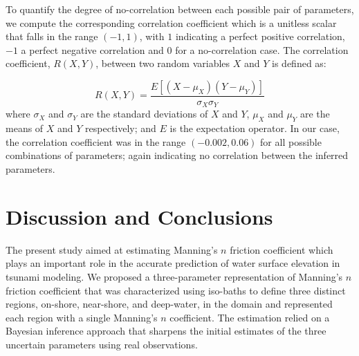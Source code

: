 \documentclass[review,12pt]{elsarticle}
\begin{document}
To quantify the degree of no-correlation between each possible pair of parameters, we compute 
the corresponding correlation coefficient which is a unitless scalar that falls in the range 
$(-1, 1)$, with $1$ indicating a perfect positive correlation, $−1$ a perfect negative correlation and $0$ for
a no-correlation case.
The correlation coefficient, $R(X, Y )$, between two random variables $X$ and $Y$ is defined as:

\begin{equation}
R(X,Y) = \frac{E[(X - \mu_X)(Y - \mu_Y )]}{\sigma_X \sigma_Y} 
\end{equation}
where $\sigma_X$ and  $\sigma_Y$ are the standard deviations of  $X$ and $Y$, $\mu_X$
and $\mu_Y$  are the means of  $X$ and $Y$ respectively;
and $E$ is the expectation operator.  In our case, the correlation coefficient
was in the range $(-0.002 , 0.06)$ for all possible combinations of parameters; again indicating no correlation
between the inferred parameters.



\section{Discussion and Conclusions}
\label{sec:conc}

The present study aimed at estimating Manning's $n$ friction coefficient  which
plays an important role in the accurate prediction of water surface elevation in
tsunami modeling. We proposed a three-parameter representation of Manning's $n$
friction coefficient that was characterized using iso-baths  to define three
distinct regions, on-shore, near-shore, and deep-water, in the domain and
represented each region with a single Manning's $n$ coefficient.  The estimation
relied on a Bayesian inference approach that sharpens the initial estimates of
the three uncertain parameters using real observations.
\end{document}
